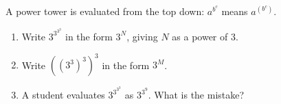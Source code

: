 A power tower is evaluated from the top down: $a^{b^c}$ means $a^{\left(b^c\right)}$.
\begin{enumerate}
\item[(a)] Write $3^{3^{3^3}}$ in the form $3^N$, giving $N$ as a power of $3$.
\item[(b)] Write $\left(\left(3^3\right)^3\right)^3$ in the form $3^M$.
\item[(c)] A student evaluates $3^{3^{3^3}}$ as $3^{3^9}$. What is the mistake?
\end{enumerate}
